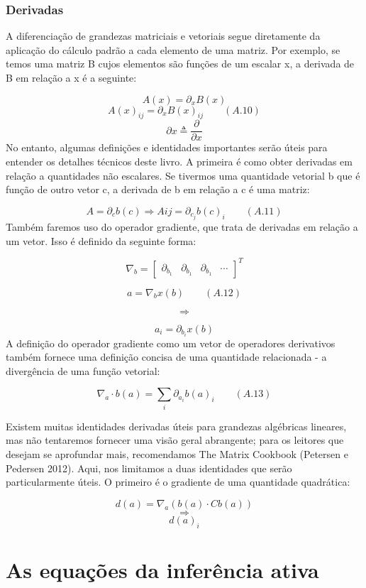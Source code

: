 \documentclass[
  12pt,
]{book}
\begin{document}
\hypertarget{derivadas}{%
\subsection{Derivadas}\label{derivadas}}

A diferenciação de grandezas matriciais e vetoriais segue diretamente da aplicação do cálculo padrão a cada elemento de uma matriz. Por exemplo, se temos uma matriz B cujos elementos são funções de um escalar x, a derivada de B em relação a x é a seguinte:

\[ A(x) = \partial_x B(x)  \]
\[ A(x)_{ij} = \partial_x B(x)_{ij} \qquad (A.10)\]
\[ \partial x \triangleq  \frac {\partial} {\partial x} \]
No entanto, algumas definições e identidades importantes serão úteis para entender os detalhes técnicos deste livro. A primeira é como obter derivadas em relação a quantidades não escalares. Se tivermos uma quantidade vetorial b que é função de outro vetor c, a derivada de b em relação a c é uma matriz:

\[ A = \partial_c b(c) \Longrightarrow A{ij} = \partial_{c_j}b(c)_i  \qquad (A.11)\]
Também faremos uso do operador gradiente, que trata de derivadas em relação a um vetor. Isso é definido da seguinte forma:

\[ \nabla_b = \begin{bmatrix} 
\partial_{b_1} &  \partial_{b_1} & \partial_{b_1} & \cdots 
\end{bmatrix}^T  \]

\[ a = \nabla_bx(b) \qquad (A.12)\]

\[ \Longrightarrow \]

\[ a_i = \partial_{b_i}x(b)\]
A definição do operador gradiente como um vetor de operadores derivativos também fornece uma definição concisa de uma quantidade relacionada - a divergência de uma função vetorial:

\[ \nabla_a \cdot b(a) = \sum_i \partial_{a_i}b(a)_i \qquad (A.13)\]

Existem muitas identidades derivadas úteis para grandezas algébricas lineares, mas não tentaremos fornecer uma visão geral abrangente; para os leitores que desejam se aprofundar mais, recomendamos The Matrix Cookbook (Petersen e Pedersen 2012). Aqui, nos limitamos a duas identidades que serão particularmente úteis. O primeiro é o gradiente de uma quantidade quadrática:

\[ d(a) = \nabla_a(b(a) \cdot Cb(a))\]
\[ \Longrightarrow\]
\[d(a)_i\]

\hypertarget{as-equauxe7uxf5es-da-inferuxeancia-ativa}{%
\chapter{As equações da inferência ativa}\label{as-equauxe7uxf5es-da-inferuxeancia-ativa}}
\end{document}
